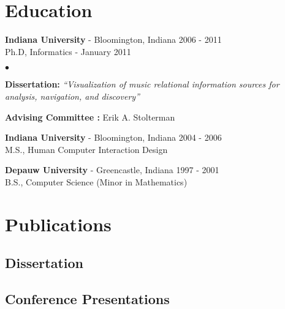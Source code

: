 \documentclass[margin,line]{res}
\let\resumesection\section
\newenvironment{list2}{
  \begin{list}{$\bullet$}{%
      \setlength{\itemsep}{0in}
      \setlength{\parsep}{0in} \setlength{\parskip}{0in}
      \setlength{\topsep}{0in} \setlength{\partopsep}{0in} 
      \setlength{\leftmargin}{0.2in}}}{\end{list}}
\begin{document}
\begin{resume}
\section{\sc Education}
{\bf Indiana University} - Bloomington, Indiana \hfill 2006 - 2011\\
Ph.D, Informatics - January 2011
\begin{list2}
\item {\bf \small Dissertation:} {\em``Visualization of music relational information sources for analysis, navigation, and discovery''}
\item {\bf \small Advising Committee :} Erik A. Stolterman
\end{list2}

{\bf Indiana University} - Bloomington, Indiana \hfill 2004 - 2006\\
M.S., Human Computer Interaction Design

{\bf Depauw University} - Greencastle, Indiana \hfill 1997 - 2001\\
B.S., Computer Science (Minor in Mathematics)


\vspace{20px}
\section{\sc Publications}
\subsection{\sc Dissertation}

\renewcommand{\section}[2]{}
\renewcommand{\section}{\resumesection}


\subsection{\sc Conference Presentations}

\renewcommand{\section}[2]{}
\renewcommand{\section}{\resumesection}



\end{resume}
\end{document}
